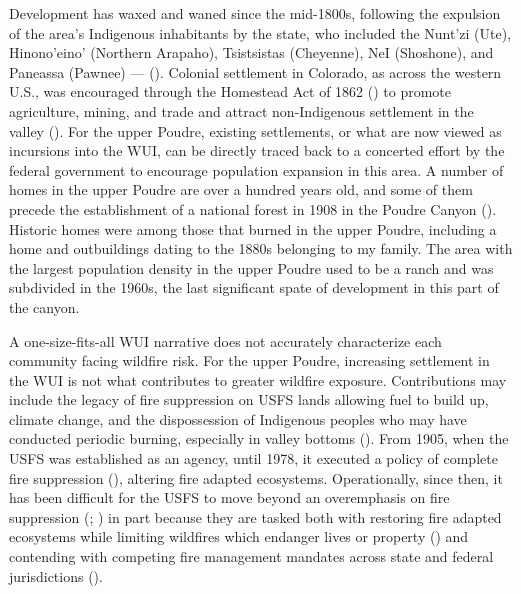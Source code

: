 \documentclass[
]{article}
\begin{document}
Development has waxed and waned since the mid-1800s, following the expulsion of the area's Indigenous inhabitants by the state, who included the Nunt'zi (Ute), Hinono'eino' (Northern Arapaho), Tsistsistas (Cheyenne), NeI (Shoshone), and Paneassa (Pawnee) --- (). Colonial settlement in Colorado, as across the western U.S., was encouraged through the Homestead Act of 1862 () to promote agriculture, mining, and trade and attract non-Indigenous settlement in the valley (). For the upper Poudre, existing settlements, or what are now viewed as incursions into the WUI, can be directly traced back to a concerted effort by the federal government to encourage population expansion in this area. A number of homes in the upper Poudre are over a hundred years old, and some of them precede the establishment of a national forest in 1908 in the Poudre Canyon (). Historic homes were among those that burned in the upper Poudre, including a home and outbuildings dating to the 1880s belonging to my family. The area with the largest population density in the upper Poudre used to be a ranch and was subdivided in the 1960s, the last significant spate of development in this part of the canyon.

A one-size-fits-all WUI narrative does not accurately characterize each community facing wildfire risk. For the upper Poudre, increasing settlement in the WUI is not what contributes to greater wildfire exposure. Contributions may include the legacy of fire suppression on USFS lands allowing fuel to build up, climate change, and the dispossession of Indigenous peoples who may have conducted periodic burning, especially in valley bottoms (). From 1905, when the USFS was established as an agency, until 1978, it executed a policy of complete fire suppression (), altering fire adapted ecosystems. Operationally, since then, it has been difficult for the USFS to move beyond an overemphasis on fire suppression (; ) in part because they are tasked both with restoring fire adapted ecosystems while limiting wildfires which endanger lives or property () and contending with competing fire management mandates across state and federal jurisdictions ().
\end{document}
